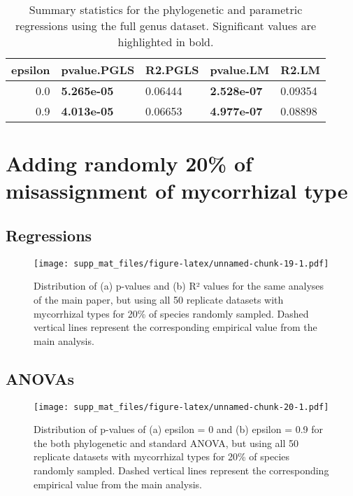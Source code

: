 \documentclass[]{article}
\begin{document}
\begin{table}[H]

\caption{\label{tab:unnamed-chunk-17}Summary statistics for the phylogenetic and parametric regressions using the full genus dataset. Significant values are highlighted in bold.}
\centering
\begin{tabular}{r|l|l|l|l}
\hline
epsilon & pvalue.PGLS & R2.PGLS & pvalue.LM & R2.LM\\
\hline
0.0 & \textbf{5.265e-05} & 0.06444 & \textbf{2.528e-07} & 0.09354\\
\hline
0.9 & \textbf{4.013e-05} & 0.06653 & \textbf{4.977e-07} & 0.08898\\
\hline
\end{tabular}
\end{table}

\hypertarget{adding-randomly-20-of-misassignment-of-mycorrhizal-type}{%
\section{Adding randomly 20\% of misassignment of mycorrhizal
type}\label{adding-randomly-20-of-misassignment-of-mycorrhizal-type}}

\hypertarget{regressions}{%
\subsection{Regressions}\label{regressions}}

\begin{figure}
\centering
\texttt{[image: supp\_mat\_files/figure-latex/unnamed-chunk-19-1.pdf]}
\caption{Distribution of (a) p-values and (b) R² values for the same
analyses of the main paper, but using all 50 replicate datasets with
mycorrhizal types for 20\% of species randomly sampled. Dashed vertical
lines represent the corresponding empirical value from the main
analysis.}
\end{figure}

\hypertarget{anovas}{%
\subsection{ANOVAs}\label{anovas}}

\begin{figure}
\centering
\texttt{[image: supp\_mat\_files/figure-latex/unnamed-chunk-20-1.pdf]}
\caption{Distribution of p-values of (a) epsilon = 0 and (b) epsilon =
0.9 for the both phylogenetic and standard ANOVA, but using all 50
replicate datasets with mycorrhizal types for 20\% of species randomly
sampled. Dashed vertical lines represent the corresponding empirical
value from the main analysis.}
\end{figure}
\end{document}
